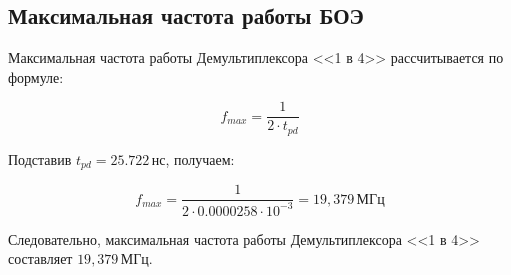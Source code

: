 \subsection{Максимальная частота работы БОЭ}
Максимальная частота работы Демультиплексора <<1 в 4>> рассчитывается по формуле:

\[
	f_{max} = \frac{1}{2 \cdot t_{pd}}
\]

Подставив \( t_{pd} = 25.722 \, \text{нс} \), получаем:

\[
	f_{max} = \frac{1}{2 \cdot 0.0000258 \cdot 10^{-3}} = 19,379 \, \text{МГц}
\]

Следовательно, максимальная частота работы Демультиплексора <<1 в 4>> составляет \( 19,379 \, \text{МГц} \).
